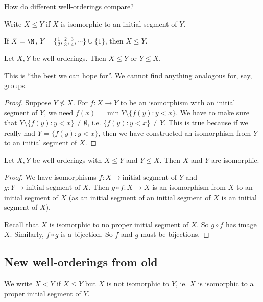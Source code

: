 \documentclass[a4paper]{article}
\begin{document}
How do different well-orderings compare?
\begin{notation}
  Write $X\leq Y$ if $X$ is isomorphic to an initial segment of $Y$.
\end{notation}

\begin{eg}
  If $X = \N$, $Y = \{\frac{1}{2}, \frac{2}{3}, \frac{3}{4},\cdots\}\cup \{1\}$, then $X \leq Y$.
\end{eg}

\begin{thm}
  Let $X, Y$ be well-orderings. Then $X\leq Y$ or $Y \leq X$.

  This is ``the best we can hope for''. We cannot find anything analogous for, say, groups.
\end{thm}

\begin{proof}
  Suppose $Y \not\leq X$. For $f: X\to Y$ to be an isomorphism with an initial segment of $Y$, we need $f(x) = \min Y\setminus \{f(y): y < x\}$. We have to make sure that $Y\setminus \{f(y): y < x\}\not= \emptyset$, i.e. $\{f(y): y < x\} \not= Y$. This is true because if we really had $Y = \{f(y): y < x\}$, then we have constructed an isomorphism from $Y$ to an initial segment of $X$.
\end{proof}

\begin{thm}
  Let $X, Y$ be well-orderings with $X\leq Y$ and $Y \leq X$. Then $X$ and $Y$ are isomorphic.
\end{thm}

\begin{proof}
  We have isomorphisms $f: X\to \text{initial segment of }Y$ and $g: Y\to \text{initial segment of }X$. Then $g\circ f: X\to X$ is an isomorphism from $X$ to an initial segment of $X$ (as an initial segment of an initial segment of $X$ is an initial segment of $X$).

  Recall that $X$ is isomorphic to no proper initial segment of $X$. So $g\circ f$ has image $X$. Similarly, $f\circ g$ is a bijection. So $f$ and $g$ must be bijections.
\end{proof}

\subsection{New well-orderings from old}
We write $X < Y$ if $X\leq Y$ but $X$ is not isomorphic to $Y$, ie. $X$ is isomorphic to a proper initial segment of $Y$.
\end{document}
